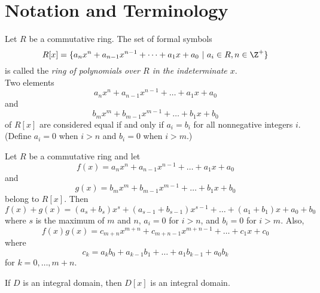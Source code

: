\section{Notation and Terminology}

\begin{definition}
	Let $R$ be a commutative ring. The set of formal symbols
	\[ R[x] = \{a_nx^n + a_{n-1}x^{n-1}+\dots+a_1x + a_0\ \vert\ a_i \in R, n \in \Z^+\} \]
	is called the \textit{ring of polynomials over $R$ in the indeterminate $x$}.\\
	\noindent Two elements
	\[ a_nx^n + a_{n-1}x^{n-1} + \dots + a_1x + a_0 \]
	\noindent and
	\[ b_mx^m + b_{m-1}x^{m-1} + \dots + b_1x + b_0 \]
	\noindent of $R[x]$ are considered equal if and only if $a_i=b_i$ for all nonnegative integers $i$. (Define $a_i=0$ when $i > n$ and $b_i = 0$ when $i > m$.)
\end{definition}

\begin{definition}
	Let $R$ be a commutative ring and let
	\[ f(x) = a_nx^n + a_{n-1}x^{n-1} + \dots + a_1x + a_0 \]
	\noindent and
	\[ g(x) = b_mx^m + b_{m-1}x^{m-1} + \dots + b_1x + b_0 \]
	\noindent belong to $R[x]$. Then
	\[ f(x) + g(x) = (a_s + b_s)x^s + (a_{s-1} + b_{s-1})x^{s-1} + \dots + (a_1 + b_1)x + a_0 + b_0 \]
	\noindent where $s$ is the maximum of $m$ and $n$, $a_i = 0$ for $i > n$, and $b_i = 0$ for $i > m$. Also,
	\[ f(x)g(x) = c_{m+n}x^{m+n}+c_{m+n-1}x^{m+n-1} + \dots + c_1x + c_0 \]
	\noindent where
	\[ c_k = a_kb_0 + a_{k-1}b_1 + \dots + a_1b_{k-1} + a_0b_k \]
	\noindent for $k=0,\dots, m+n$.
\end{definition}

\begin{theorem}
	If $D$ is an integral domain, then $D[x]$ is an integral domain.
\end{theorem}
